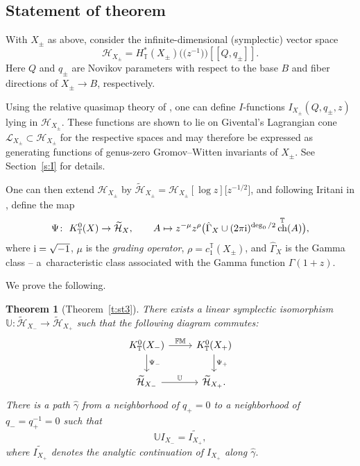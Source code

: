 \documentclass[pdftex]{sigma}
\newtheorem{Theorem}{Theorem}[section]
\numberwithin{equation}{section}
\newcommand{\cc}[1]{\mathcal{#1}} %
\newcommand{\UU}{\mathbb{U}}
\newcommand{\torus}{\mathbb{T}}
\newcommand{\FM}{\mathbb{FM}}
\DeclareMathOperator{\ch}{ch}
\newcommand{\op}[1]{\operatorname{#1}}
\begin{document}
\subsection{Statement of theorem}
With $X_\pm$ as above, consider the infinite-dimensional (symplectic) vector space
\[
\cc H_{X_\pm} = H^*_\torus(X_\pm)\bigl(\!\bigl(z^{-1}\bigr)\!\bigr)[\![Q, q_\pm]\!].
\]
Here $Q$ and $q_\pm$ are Novikov parameters with respect to the base $B$ and fiber directions of $X_\pm \to B$, respectively.

Using the relative quasimap theory of \cite{Oh1}, one can define $I$-functions
$I_{X_\pm}(Q, q_\pm, z)$
lying in $\cc H_{X_\pm}$. These functions are shown to lie on Givental's Lagrangian cone $\cc L_{X_\pm} \subset \cc H_{X_\pm}$ for the respective spaces and may therefore be expressed as generating functions of genus-zero Gromov--Witten invariants of $X_\pm$. See Section~\ref{s:I} for details.

One can then extend $\cc H_{X_\pm}$ by
$\widetilde{\cc H}_{X_\pm} = \cc H_{X_\pm}[\log z]\bigl[z^{-1/2}\bigr]$, and following Iritani in \cite{IriInt}, define the map
\begin{align*}
\Psi\colon \ K^0_\torus(X) \to \widetilde{\cc H}_X, \qquad
A \mapsto z^{- \mu} z^{\rho} \bigl( \hat \Gamma_X \cup (2 \pi {\rm i})^{\op{deg}_0/2} \ch^\torus(A) \bigr),
\end{align*}
where ${\rm i} = \sqrt{-1}$, $\mu$ is the \emph{grading operator}, $\rho = c_1^\torus(X_\pm)$, and $\hat \Gamma_X$ is the Gamma class -- a~characteristic class associated with the Gamma function $\Gamma(1 + z)$.

We prove the following.

\begin{Theorem}[Theorem~\ref{t:st3}]\label{st0}
There exists a linear symplectic isomorphism
$
\UU\colon \widetilde{\cc H}_{X_{-}} \to \widetilde{\cc H}_{X_{+}}
$
such that
the following diagram commutes:
\begin{equation}
 \label{ec1}
\begin{tikzcd}
K^0_\torus(X_{-}) \ar[r, "\FM"] \ar[d, "\Psi_-"] & K^0_\torus(X_{+}) \ar[d, "\Psi_+"] \\
\widetilde{\cc H}_{X_{-}} \ar[r, "\UU"] & \widetilde{\cc H}_{X_{+}}.
\end{tikzcd}
\end{equation}
There is a path $\hat \gamma$ from a neighborhood of $q_+ = 0$ to a neighborhood of $q_- = q_+^{-1} = 0$ such that
\begin{equation}\label{ec2}
 \UU I_{X_{-}} =\widetilde{I_{X_{+}}},
\end{equation}
where $\widetilde{I_{X_{+}}}$ denotes the analytic continuation of $I_{X_{+}}$ along $\hat \gamma.$

\end{Theorem}
\end{document}
